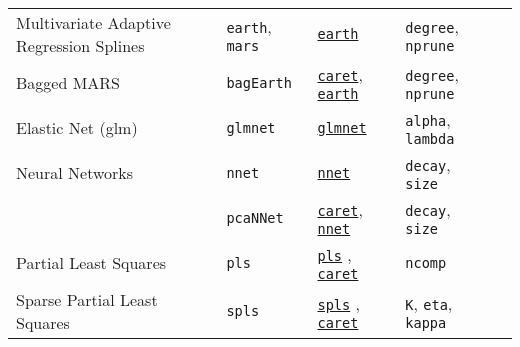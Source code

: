 \documentclass[12pt]{article}
\begin{document}
\begin{landscape}
\begin{longtable}{lllll}
      Multivariate Adaptive Regression Splines &
         \texttt{earth}, \texttt{mars} & 
             {\tt \href{http://cran.r-project.org/web/packages/earth/index.html}{earth}}      & 
            \texttt{degree}, \texttt{nprune} & \\            

\rowcolor[rgb]{.95, .95, .95}                     
      Bagged MARS &
         \texttt{bagEarth} & 
            {\tt \href{http://cran.r-project.org/web/packages/caret/index.html}{caret}},   {\tt \href{http://cran.r-project.org/web/packages/earth/index.html}{earth}}      & 
            \texttt{degree}, \texttt{nprune} & \\ 
            
      Elastic Net (glm) &               
         \texttt{glmnet} & 
             {\tt \href{http://cran.r-project.org/web/packages/glmnet/index.html}{glmnet}}       &       
            \texttt{alpha}, \texttt{lambda} & \\ 
            
\rowcolor[rgb]{.95, .95, .95}                     
      Neural Networks &               
         \texttt{nnet} & 
             {\tt \href{http://cran.r-project.org/web/packages/nnet/index.html}{nnet}}       &       
            \texttt{decay}, \texttt{size} & \\      

\rowcolor[rgb]{.95, .95, .95}         
       &               
         \texttt{pcaNNet} & 
            {\tt \href{http://cran.r-project.org/web/packages/caret/index.html}{caret}},
            {\tt \href{http://cran.r-project.org/web/packages/nnet/index.html}{nnet}}&       
            \texttt{decay}, \texttt{size} & \\              
            
      Partial Least Squares &
         \texttt{pls} & 
             {\tt \href{http://cran.r-project.org/web/packages/pls/index.html}{pls}} ,  {\tt \href{http://cran.r-project.org/web/packages/caret/index.html}{caret}}       & 
            \texttt{ncomp} & \\      

\rowcolor[rgb]{.95, .95, .95}         

      Sparse Partial Least Squares&
         \texttt{spls} & 
             {\tt \href{http://cran.r-project.org/web/packages/spls/index.html}{spls}} , 
             {\tt \href{http://cran.r-project.org/web/packages/caret/index.html}{caret}}      & 
            \texttt{K}, \texttt{eta}, \texttt{kappa} & \\   
      

\end{longtable}
\end{landscape}
\end{document}
